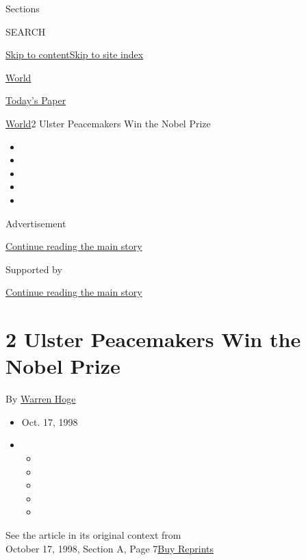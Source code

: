 Sections

SEARCH

\protect\hyperlink{site-content}{Skip to
content}\protect\hyperlink{site-index}{Skip to site index}

\href{https://www.nytimes.com/section/world}{World}

\href{https://myaccount.nytimes.com/auth/login?response_type=cookie\&client_id=vi}{}

\href{https://www.nytimes.com/section/todayspaper}{Today's Paper}

\href{/section/world}{World}\textbar{}2 Ulster Peacemakers Win the Nobel
Prize

\begin{itemize}
\item
\item
\item
\item
\item
\end{itemize}

Advertisement

\protect\hyperlink{after-top}{Continue reading the main story}

Supported by

\protect\hyperlink{after-sponsor}{Continue reading the main story}

\hypertarget{2-ulster-peacemakers-win-the-nobel-prize}{%
\section{2 Ulster Peacemakers Win the Nobel
Prize}\label{2-ulster-peacemakers-win-the-nobel-prize}}

By \href{https://www.nytimes.com/by/warren-hoge}{Warren Hoge}

\begin{itemize}
\item
  Oct. 17, 1998
\item
  \begin{itemize}
  \item
  \item
  \item
  \item
  \item
  \end{itemize}
\end{itemize}

See the article in its original context from\\
October 17, 1998, Section A, Page
7\href{https://store.nytimes.com/collections/new-york-times-page-reprints?utm_source=nytimes\&utm_medium=article-page\&utm_campaign=reprints}{Buy
Reprints}

